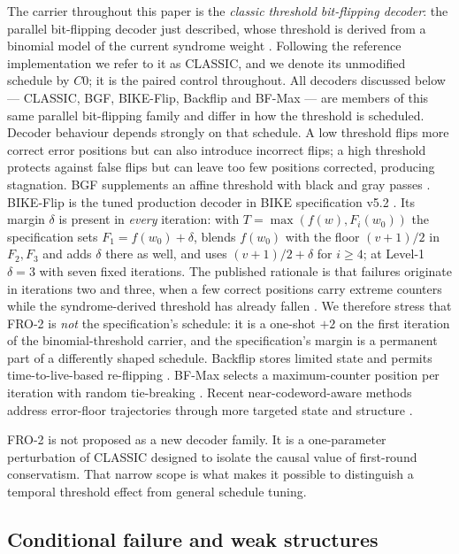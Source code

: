 \documentclass[lettersize,journal]{IEEEtran}
\begin{document}
The carrier throughout this paper is the \emph{classic threshold bit-flipping decoder}: the parallel bit-flipping decoder just described, whose threshold is derived from a binomial model of the current syndrome weight \cite{misoczki2013mdpc,vasseur2021thesis}. Following the reference implementation we refer to it as CLASSIC, and we denote its unmodified schedule by $C0$; it is the paired control throughout. All decoders discussed below --- CLASSIC, BGF, BIKE-Flip, Backflip and BF-Max --- are members of this same parallel bit-flipping family and differ in how the threshold is scheduled. Decoder behaviour depends strongly on that schedule. A low threshold flips more correct error positions but can also introduce incorrect flips; a high threshold protects against false flips but can leave too few positions corrected, producing stagnation. BGF supplements an affine threshold with black and gray passes \cite{drucker2020shades}. BIKE-Flip is the tuned production decoder in BIKE specification v5.2 \cite{bike2024spec}. Its margin $\delta$ is present in \emph{every} iteration: with $T=\max(f(w),F_i(w_0))$ the specification sets $F_1=f(w_0)+\delta$, blends $f(w_0)$ with the floor $(v{+}1)/2$ in $F_2,F_3$ and adds $\delta$ there as well, and uses $(v{+}1)/2+\delta$ for $i\ge 4$; at Level-1 $\delta=3$ with seven fixed iterations. The published rationale is that failures originate in iterations two and three, when a few correct positions carry extreme counters while the syndrome-derived threshold has already fallen \cite{sendrier2024seminar}. We therefore stress that FRO-2 is \emph{not} the specification's schedule: it is a one-shot $+2$ on the first iteration of the binomial-threshold carrier, and the specification's margin is a permanent part of a differently shaped schedule. Backflip stores limited state and permits time-to-live-based re-flipping \cite{sendrier2020lowdfr}. BF-Max selects a maximum-counter position per iteration with random tie-breaking \cite{baldelli2025bfmax}. Recent near-codeword-aware methods address error-floor trajectories through more targeted state and structure \cite{baldelli2026ncw,santini2026flip}.

FRO-2 is not proposed as a new decoder family. It is a one-parameter perturbation of CLASSIC designed to isolate the causal value of first-round conservatism. That narrow scope is what makes it possible to distinguish a temporal threshold effect from general schedule tuning.

\subsection{Conditional failure and weak structures}
\end{document}
